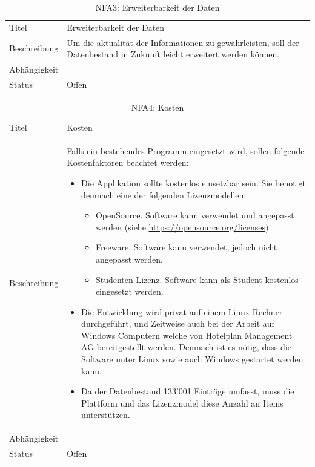 \begin{table}[H] 
	\caption{NFA3: Erweiterbarkeit der Daten}
	\centering
	\label{fig:anforderungsanalyse:nichtfunktionaleanforderung:nfa3}
	\begin{tabular}{ | l | L{10cm} | } 
		\hline 
		 \\ \hline 
		Titel & Erweiterbarkeit der Daten \\ \hline 
		Beschreibung & Um die aktualität der Informationen zu gewährleisten, soll der Datenbestand in Zukunft leicht erweitert werden können. \\ \hline 
		Abhängigkeit & \\ \hline 
		Status & Offen \\ \hline 
	\end{tabular}
\end{table}
 
 \begin{table}[H] 
	\caption{NFA4: Kosten}
	\centering
	\label{fig:anforderungsanalyse:nichtfunktionaleanforderung:nfa4}
	\begin{tabular}{ | l | L{10cm} | } 
		\hline 
		 \\ \hline 
		Titel & Kosten \\ \hline 
		Beschreibung & Falls ein bestehendes Programm eingesetzt wird, sollen folgende Kostenfaktoren beachtet werden: 
		\begin{itemize}
		\item Die Applikation sollte kostenlos einsetzbar sein. Sie benötigt demnach eine der folgenden Lizenzmodellen:
		\begin{itemize}
		\item OpenSource. Software kann verwendet und angepasst werden (siehe \url{https://opensource.org/licenses}).
		\item Freeware. Software kann verwendet, jedoch nicht angepasst werden.
		\item Studenten Lizenz. Software kann als Student kostenlos eingesetzt werden.
		\end{itemize}
		\item Die Entwicklung wird privat auf einem Linux Rechner durchgeführt, und Zeitweise auch bei der Arbeit auf Windows Computern welche von Hotelplan Management AG bereitgestellt werden.
		Demnach ist es nötig, dass die Software unter Linux sowie auch Windows gestartet werden kann.
		\item Da der Datenbestand 133'001 Einträge umfasst, muss die Plattform und das Lizenzmodel diese Anzahl an Items unterstützen.
		\end{itemize}\\ \hline 
		Abhängigkeit & \\ \hline 
		Status & Offen \\ \hline 
	\end{tabular}
\end{table}

